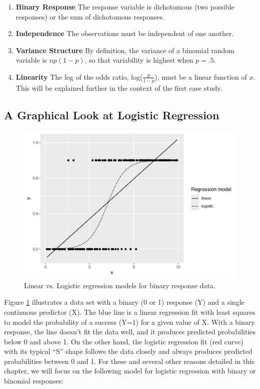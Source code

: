 \documentclass[
]{krantz}
\providecommand{\tightlist}{%
  \setlength{\itemsep}{0pt}\setlength{\parskip}{0pt}}
\begin{document}
\begin{enumerate}
\def\labelenumi{\arabic{enumi}.}
\tightlist
\item
  \textbf{Binary Response} The response variable is dichotomous (two possible responses) or the sum of dichotomous responses.
\item
  \textbf{Independence} The observations must be independent of one another.
\item
  \textbf{Variance Structure} By definition, the variance of a binomial random variable is \(np(1-p)\), so that variability is highest when \(p=.5\).
\item
  \textbf{Linearity} The log of the odds ratio, log(\(\frac{p}{1-p}\)), must be a linear function of \(x\). This will be explained further in the context of the first case study.
\end{enumerate}

\hypertarget{a-graphical-look-at-logistic-regression}{%
\subsection{A Graphical Look at Logistic Regression}\label{a-graphical-look-at-logistic-regression}}

\begin{figure}

{\centering \includegraphics[width=0.6\linewidth]{bookdown-BeyondMLR_files/figure-latex/OLSlogistic-1} 

}

\caption{Linear vs. Logistic regression models for binary response data.}\label{fig:OLSlogistic}
\end{figure}

Figure \ref{fig:OLSlogistic} illustrates a data set with a binary (0 or 1) response (Y) and a single continuous predictor (X). The blue line is a linear regression fit with least squares to model the probability of a success (Y=1) for a given value of X. With a binary response, the line doesn't fit the data well, and it produces predicted probabilities below 0 and above 1. On the other hand, the logistic regression fit (red curve) with its typical ``S'' shape follows the data closely and always produces predicted probabilities between 0 and 1. For these and several other reasons detailed in this chapter, we will focus on the following model for logistic regression with binary or binomial responses:
\end{document}
